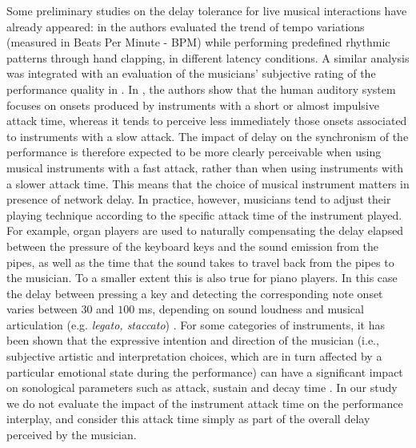 Some preliminary studies on the delay tolerance for live musical interactions have already appeared: in \cite{gurevich2004simulation,chafe2010effect,chafe2004effect,chafe2004network} the authors evaluated the trend of tempo variations (measured in Beats Per Minute - BPM) while performing predefined rhythmic patterns through hand clapping, in different latency conditions. A similar analysis was integrated with an evaluation of the musicians' subjective rating of the performance quality in \cite{carot2009towards}. In \cite{barbosa2011influence}, the authors show that the human auditory system focuses on onsets produced by instruments with a short or almost impulsive attack time, whereas it tends to perceive less immediately those onsets associated to instruments with a slow attack. The impact of delay on the synchronism of the performance is therefore expected to be more clearly perceivable when using musical instruments with a fast attack, rather than when using instruments with a slower attack time. This means that the choice of musical instrument matters in presence of network delay. In practice, however, musicians tend to adjust their playing technique according to the specific attack time of the instrument played. For example, organ players are used to naturally compensating the delay elapsed between the pressure of the keyboard keys and the sound emission from the pipes, as well as the time that the sound takes to travel back from the pipes to the musician. To a smaller extent this is also true for piano players. In this case the delay between pressing a key and detecting the corresponding note onset varies between $30$ and $100$ ms, depending on sound loudness and musical articulation (e.g. \textit{legato, staccato}) \cite{askenfelt}. For some categories of instruments, it has been shown that the expressive intention and direction of the musician (i.e., subjective artistic and interpretation choices, which are in turn affected by a particular emotional state during the performance) can have a significant impact on sonological parameters such as attack, sustain and decay time \cite{clarinet}. In our study we do not evaluate the impact of the instrument attack time on the performance interplay, and consider this attack time simply as part of the overall delay perceived by the musician. 

